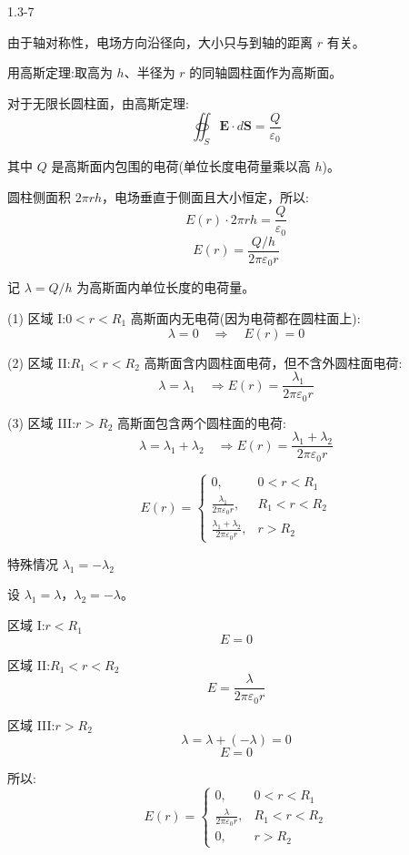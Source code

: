 \documentclass{article}
\begin{document}
1.3-7

由于轴对称性，电场方向沿径向，大小只与到轴的距离 $ r $ 有关。
  
用高斯定理:取高为 $ h $、半径为 $ r $ 的同轴圆柱面作为高斯面。

对于无限长圆柱面，由高斯定理:
$$\oiint_S \mathbf{E} \cdot d\mathbf{S} = \frac{Q}{\varepsilon_0}$$

其中 $ Q $ 是高斯面内包围的电荷(单位长度电荷量乘以高 $ h $)。

圆柱侧面积 $ 2\pi r h $，电场垂直于侧面且大小恒定，所以:
$$E(r) \cdot 2\pi r h = \frac{Q}{\varepsilon_0}$$
$$E(r) = \frac{Q / h}{2\pi \varepsilon_0 r}$$

记 $ \lambda = Q / h $ 为高斯面内单位长度的电荷量。


 (1) 区域 I:$ 0 < r < R_1 $
高斯面内无电荷(因为电荷都在圆柱面上):
$$\lambda = 0 \quad \Rightarrow \quad E(r) = 0$$

 (2) 区域 II:$ R_1 < r < R_2 $
高斯面含内圆柱面电荷，但不含外圆柱面电荷:
$$\lambda = \lambda_1\quad \Rightarrow E(r) = \frac{\lambda_1}{2\pi \varepsilon_0 r}$$


 (3) 区域 III:$ r > R_2 $
高斯面包含两个圆柱面的电荷:
$$\lambda = \lambda_1 + \lambda_2\quad \Rightarrow E(r) = \frac{\lambda_1 + \lambda_2}{2\pi \varepsilon_0 r}$$


$$E(r) =
\begin{cases}
0, & 0 < r < R_1 \\[4pt]
\displaystyle \frac{\lambda_1}{2\pi \varepsilon_0 r}, & R_1 < r < R_2 \\[8pt]
\displaystyle \frac{\lambda_1 + \lambda_2}{2\pi \varepsilon_0 r}, & r > R_2
\end{cases}$$


\newpage
特殊情况 $\lambda_1 = -\lambda_2$

设 $\lambda_1 = \lambda$，$\lambda_2 = -\lambda$。

 区域 I:$ r < R_1 $
$$E = 0$$

 区域 II:$ R_1 < r < R_2 $
$$E = \frac{\lambda}{2\pi \varepsilon_0 r}$$

 区域 III:$ r > R_2 $
$$\lambda = \lambda + (-\lambda) = 0$$
$$E = 0$$

所以:
$$
E(r) =
\begin{cases}
0, & 0 < r < R_1 \\[4pt]
\displaystyle \frac{\lambda}{2\pi \varepsilon_0 r}, & R_1 < r < R_2 \\[8pt]
0, & r > R_2
\end{cases}
$$
\end{document}
